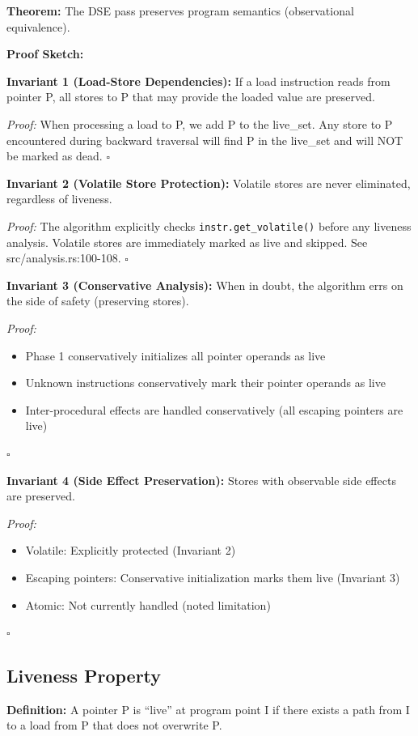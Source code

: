 \documentclass[journal]{IEEEtran}
\begin{document}
\textbf{Theorem:} The DSE pass preserves program semantics (observational equivalence).

\textbf{Proof Sketch:}

\textbf{Invariant 1 (Load-Store Dependencies):} If a load instruction reads from pointer P, all stores to P that may provide the loaded value are preserved.

\textit{Proof:} When processing a load to P, we add P to the live\_set. Any store to P encountered during backward traversal will find P in the live\_set and will NOT be marked as dead. $\square$

\textbf{Invariant 2 (Volatile Store Protection):} Volatile stores are never eliminated, regardless of liveness.

\textit{Proof:} The algorithm explicitly checks \texttt{instr.get\_volatile()} before any liveness analysis. Volatile stores are immediately marked as live and skipped. See src/analysis.rs:100-108. $\square$

\textbf{Invariant 3 (Conservative Analysis):} When in doubt, the algorithm errs on the side of safety (preserving stores).

\textit{Proof:}
\begin{itemize}
\item Phase 1 conservatively initializes all pointer operands as live
\item Unknown instructions conservatively mark their pointer operands as live
\item Inter-procedural effects are handled conservatively (all escaping pointers are live)
\end{itemize}
$\square$

\textbf{Invariant 4 (Side Effect Preservation):} Stores with observable side effects are preserved.

\textit{Proof:}
\begin{itemize}
\item Volatile: Explicitly protected (Invariant 2)
\item Escaping pointers: Conservative initialization marks them live (Invariant 3)
\item Atomic: Not currently handled (noted limitation)
\end{itemize}
$\square$

\subsection{Liveness Property}

\textbf{Definition:} A pointer P is ``live'' at program point I if there exists a path from I to a load from P that does not overwrite P.
\end{document}
